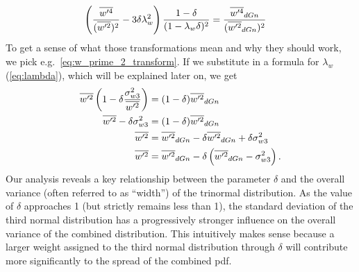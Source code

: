 \begin{align}
    \label{eq:w_prime_4_div_w_prime_2_transform}
    \left(\frac{\overline{w'^4}}{(\overline{w'^2})^2} - 3\delta\lambda_w^2 \right) \frac{1 - \delta}{(1 - \lambda_w\delta)^2}
    &= \frac{\overline{w'^4}_{dGn}}{(\overline{w'^2}_{dGn})^2}
\end{align}
To get a sense of what those transformations mean and why they should work,
we pick e.g.~\cref{eq:w_prime_2_transform}.
If we substitute in a formula for $\lambda_w$ (\cref{eq:lambda}), which will be explained later on, we get
\begin{align}
    \overline{w'^2} \left(1 - \delta\frac{\sigma_{w 3}^2}{\overline{w'^2}}\right)
    &= (1 - \delta)\overline{w'^2}_{dGn} \nonumber\\
    \overline{w'^2} - \delta\sigma_{w 3}^2
    &= (1 - \delta)\overline{w'^2}_{dGn} \nonumber\\
    \overline{w'^2}
    &= \overline{w'^2}_{dGn} - \delta\overline{w'^2}_{dGn} + \delta\sigma_{w 3}^2 \nonumber\\
    \overline{w'^2}
    &= \overline{w'^2}_{dGn} - \delta\left(\overline{w'^2}_{dGn} - \sigma_{w 3}^2\right).
\end{align}
Our analysis reveals a key relationship between the parameter $\delta$
and the overall variance (often referred to as \enquote{width}) of the trinormal distribution.
As the value of $\delta$ approaches 1 (but strictly remains less than 1),
the standard deviation of the third normal distribution
has a progressively stronger influence on the overall variance of the combined distribution.
This intuitively makes sense because a larger weight assigned to the third normal distribution through $\delta$
will contribute more significantly to the spread of the combined \gls{pdf}.

